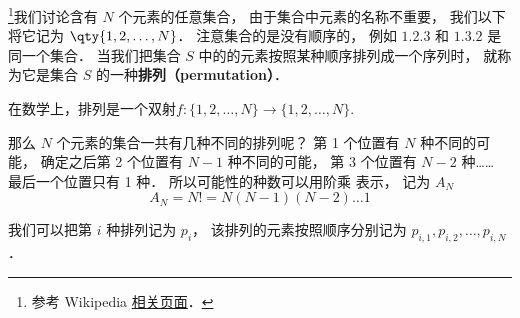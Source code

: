 


\footnote{参考 Wikipedia \href{https://en.wikipedia.org/wiki/Permutation}{相关页面}．}我们讨论含有 $N$ 个元素的任意集合， 由于集合中元素的名称不重要， 我们以下将它记为 $\qty{1,2,\dots, N}$． 注意集合的是没有顺序的， 例如 $\qty{1,2,3}$ 和 $\qty{1,3,2}$ 是同一个集合． 当我们把集合 $S$ 中的的元素按照某种顺序排列成一个序列时， 就称为它是集合 $S$ 的一种\textbf{排列（permutation）}．

在数学上，排列是一个双射$f:\{1,2,\dots,N\}\rightarrow\{1,2,\dots,N\}$.

那么 $N$ 个元素的集合一共有几种不同的排列呢？ 第 1 个位置有 $N$ 种不同的可能， 确定之后第 2 个位置有 $N-1$ 种不同的可能， 第 3 个位置有 $N-2$ 种…… 最后一个位置只有 1 种． 所以可能性的种数可以用阶乘 表示， 记为 $A_N$
\begin{equation}
A_N = N! = N(N-1)(N-2)\dots 1
\end{equation}

我们可以把第 $i$ 种排列记为 $p_i$， 该排列的元素按照顺序分别记为 $p_{i,1}, p_{i,2}, \dots, p_{i,N}$．
